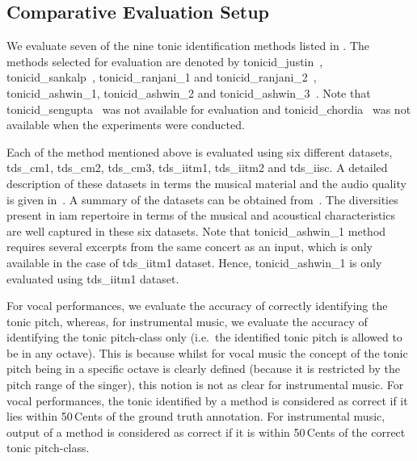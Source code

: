 \subsection{Comparative Evaluation Setup}
\label{sec:pre_processing_experimental_setup}

We evaluate seven of the nine tonic identification methods listed in . The methods selected for evaluation are
denoted by \acrshort{tonicid_justin}~\citep{salamon2012multipitch}, \acrshort{tonicid_sankalp}~\citep{gulati2012two}, \acrshort{tonicid_ranjani_1} and \acrshort{tonicid_ranjani_2}~\citep{ranjani2011carnatic}, \acrshort{tonicid_ashwin_1}, \acrshort{tonicid_ashwin_2} and \acrshort{tonicid_ashwin_3}~\citep{bellur2012knowledge}. Note that \acrshort{tonicid_sengupta}~\citep{Sengupta2005b} was not available for
evaluation and \acrshort{tonicid_chordia}~\citep{chordia2013joint} was not available when the experiments were conducted. 

Each of the method mentioned above is evaluated using six different datasets, \acrshort{tds_cm1}, \acrshort{tds_cm2}, \acrshort{tds_cm3}, \acrshort{tds_iitm1}, \acrshort{tds_iitm2} and \acrshort{tds_iisc}. A detailed description of these datasets in terms the musical material and the audio quality is given in~. A summary of the datasets can be obtained from~. The diversities present in \gls{iam} repertoire in terms of the musical and acoustical characteristics are well captured in these six datasets. Note that \acrshort{tonicid_ashwin_1} method requires several excerpts from the same concert as an input, which is only available in the case of \acrshort{tds_iitm1} dataset. Hence, \acrshort{tonicid_ashwin_1} is only evaluated using \acrshort{tds_iitm1} dataset.

For vocal performances, we evaluate the accuracy of correctly identifying the tonic pitch, whereas, for instrumental music, we evaluate the accuracy of identifying the tonic pitch-class only (i.e.~the identified tonic pitch is allowed to be in any octave). This is because whilst for vocal music the concept of the tonic pitch being in a specific octave is clearly defined (because it is restricted by the pitch range of the singer), this notion is not as clear for instrumental music. For vocal performances, the tonic identified by a method is considered as correct if it lies within 50\,Cents of the ground truth annotation. For instrumental music, output of a method is considered as correct if it is within 50\,Cents of the correct tonic pitch-class.

